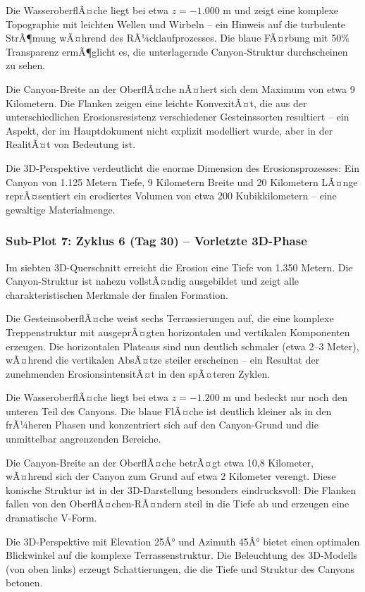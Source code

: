 Die WasseroberflÃ¤che liegt bei etwa $z = -1.000$ m und zeigt eine komplexe Topographie mit leichten Wellen und Wirbeln -- ein Hinweis auf die turbulente StrÃ¶mung wÃ¤hrend des RÃ¼cklaufprozesses. Die blaue FÃ¤rbung mit 50\% Transparenz ermÃ¶glicht es, die unterlagernde Canyon-Struktur durchscheinen zu sehen.

Die Canyon-Breite an der OberflÃ¤che nÃ¤hert sich dem Maximum von etwa 9 Kilometern. Die Flanken zeigen eine leichte KonvexitÃ¤t, die aus der unterschiedlichen Erosionsresistenz verschiedener Gesteinssorten resultiert -- ein Aspekt, der im Hauptdokument nicht explizit modelliert wurde, aber in der RealitÃ¤t von Bedeutung ist.

Die 3D-Perspektive verdeutlicht die enorme Dimension des Erosionsprozesses: Ein Canyon von 1.125 Metern Tiefe, 9 Kilometern Breite und 20 Kilometern LÃ¤nge reprÃ¤sentiert ein erodiertes Volumen von etwa 200 Kubikkilometern -- eine gewaltige Materialmenge.

\subsubsection*{Sub-Plot 7: Zyklus 6 (Tag 30) -- Vorletzte 3D-Phase}

Im siebten 3D-Querschnitt erreicht die Erosion eine Tiefe von 1.350 Metern. Die Canyon-Struktur ist nahezu vollstÃ¤ndig ausgebildet und zeigt alle charakteristischen Merkmale der finalen Formation.

Die GesteinsoberflÃ¤che weist sechs Terrassierungen auf, die eine komplexe Treppenstruktur mit ausgeprÃ¤gten horizontalen und vertikalen Komponenten erzeugen. Die horizontalen Plateaus sind nun deutlich schmaler (etwa 2--3 Meter), wÃ¤hrend die vertikalen AbsÃ¤tze steiler erscheinen -- ein Resultat der zunehmenden ErosionsintensitÃ¤t in den spÃ¤teren Zyklen.

Die WasseroberflÃ¤che liegt bei etwa $z = -1.200$ m und bedeckt nur noch den unteren Teil des Canyons. Die blaue FlÃ¤che ist deutlich kleiner als in den frÃ¼heren Phasen und konzentriert sich auf den Canyon-Grund und die unmittelbar angrenzenden Bereiche.

Die Canyon-Breite an der OberflÃ¤che betrÃ¤gt etwa 10,8 Kilometer, wÃ¤hrend sich der Canyon zum Grund auf etwa 2 Kilometer verengt. Diese konische Struktur ist in der 3D-Darstellung besonders eindrucksvoll: Die Flanken fallen von den OberflÃ¤chen-RÃ¤ndern steil in die Tiefe ab und erzeugen eine dramatische V-Form.

Die 3D-Perspektive mit Elevation 25Â° und Azimuth 45Â° bietet einen optimalen Blickwinkel auf die komplexe Terrassenstruktur. Die Beleuchtung des 3D-Modells (von oben links) erzeugt Schattierungen, die die Tiefe und Struktur des Canyons betonen.

